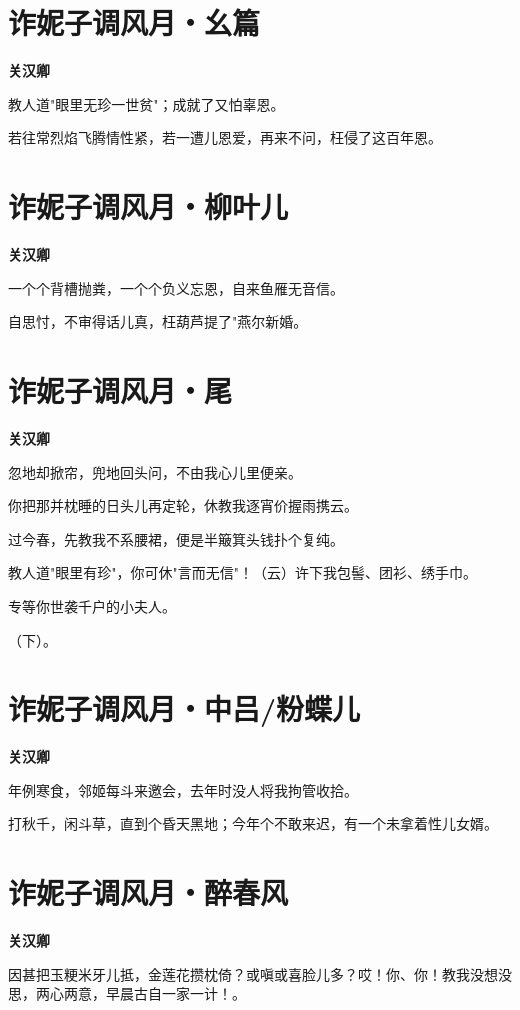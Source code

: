 \documentclass[12pt,a4paper]{ctexbook}
\begin{document}
\section{诈妮子调风月・幺篇}
\textbf{关汉卿}\par\vspace{0.5em}
教人道"眼里无珍一世贫"；成就了又怕辜恩。\par
若往常烈焰飞腾情性紧，若一遭儿恩爱，再来不问，枉侵了这百年恩。\par

\section{诈妮子调风月・柳叶儿}
\textbf{关汉卿}\par\vspace{0.5em}
一个个背槽抛粪，一个个负义忘恩，自来鱼雁无音信。\par
自思忖，不审得话儿真，枉葫芦提了"燕尔新婚。\par

\section{诈妮子调风月・尾}
\textbf{关汉卿}\par\vspace{0.5em}
忽地却掀帘，兜地回头问，不由我心儿里便亲。\par
你把那并枕睡的日头儿再定轮，休教我逐宵价握雨携云。\par
过今春，先教我不系腰裙，便是半簸箕头钱扑个复纯。\par
教人道"眼里有珍"，你可休"言而无信"！（云）许下我包髻、团衫、绣手巾。\par
专等你世袭千户的小夫人。\par
（下）。\par

\section{诈妮子调风月・中吕/粉蝶儿}
\textbf{关汉卿}\par\vspace{0.5em}
年例寒食，邻姬每斗来邀会，去年时没人将我拘管收拾。\par
打秋千，闲斗草，直到个昏天黑地；今年个不敢来迟，有一个未拿着性儿女婿。\par

\section{诈妮子调风月・醉春风}
\textbf{关汉卿}\par\vspace{0.5em}
因甚把玉粳米牙儿抵，金莲花攒枕倚？或嗔或喜脸儿多？哎！你、你！教我没想没思，两心两意，早晨古自一家一计！。\par
\end{document}

